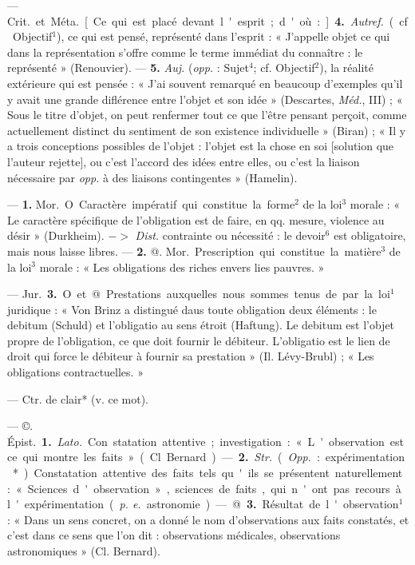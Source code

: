 \begin{itemize}[leftmargin=1cm, label=, itemsep=1pt]
— \si{Crit.} et \si{Méta.} [Ce qui est placé
devant l'esprit; d'où :]. {\bf 4.} {\it Autref.}
(cf. Objectif$^1$), ce qui est pensé,
représenté dans l'esprit : « J’appelle
objet ce qui dans la représentation
s'offre comme le terme immédiat du
connaître : le représenté » (Renouvier). — {\bf 5.} {\it Auj.} ({\it opp.} : Sujet$^4$; cf.
Objectif$^2$), la réalité extérieure qui
est pensée : « J’ai souvent remarqué
en beaucoup d'exemples qu'il y
avait une grande diflérence entre
l’objet et son idée » (Descartes,
\si{{\it Méd.}}, III) ; « Sous le titre d'objet,
on peut renfermer tout ce que l'être
pensant perçoit, comme actuellement distinct du sentiment de son
existence individuelle » (Biran) ; « Il
y a trois conceptions possibles de
l’objet : l'objet est la chose en soi
[solution que l’auteur rejette], ou
c’est l’accord des idées entre elles,
ou c’est la liaison nécessaire par
{\it opp.} à des liaisons contingentes »
(Hamelin).

 — {\bf 1.} \si{Mor.} O. Caractère
impératif qui constitue la forme$^2$ de
la loi$^3$ morale : « Le caractère spécifique de l'obligation est de faire, en
qq. mesure, violence au désir »
(Durkheim). $->$ {\it Dist.} contrainte
ou nécessité : le devoir$^6$ est obligatoire, mais nous laisse libres. — {\bf 2.}
@. \si{Mor.} Prescription qui constitue
la matière$^3$ de la loi$^3$ morale : « Les
obligations des riches envers lies
pauvres. »

— \si{Jur.} {\bf 3.} O et @. Prestations
auxquelles nous sommes tenus de
par la loi$^1$ juridique : « Von Brinz a
distingué daus toute obligation
deux éléments : le debitum (Schuld)
et l’obligatio au sens étroit (Haftung).
Le debitum est l'objet propre de
l'obligation, ce que doit fournir le
débiteur. L'obligatio est le lien de
droit qui force le débiteur à fournir
sa prestation » (Il. Lévy-Brubl) ;
« Les obligations contractuelles. »

 — Ctr. de clair* (v. ce mot).

 — ©. \si{Épist.} {\bf 1.} {\it Lato.} Con
statation attentive; investigation :
« L'observation est ce qui montre
les faits » (Cl. Bernard). — {\bf 2.} {\it Str.}
({\it Opp.} : expérimentation*). Constatation attentive des faits tels qu'ils se
présentent naturellement : « Sciences
d'observation », sciences de faits,
qui n'ont pas recours à l'expérimentation ({\it p. e.} astronomie). — @. {\bf 3.}
Résultat de l'observation$^1$ : « Dans
un sens concret, on a donné le nom
d'observations aux faits constatés,
et c’est dans ce sens que l’on dit :
observations médicales, observations astronomiques » (Cl. Bernard).


\end{itemize}
